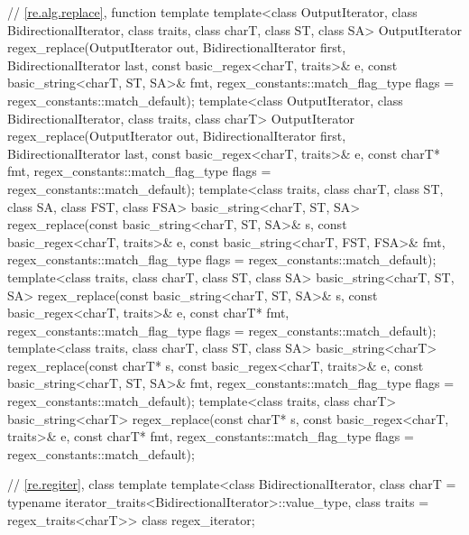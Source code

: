 \begin{codeblock}
{  // \ref{re.alg.replace}, function template 
  template<class OutputIterator, class BidirectionalIterator,
           class traits, class charT, class ST, class SA>
    OutputIterator
      regex_replace(OutputIterator out,
                    BidirectionalIterator first, BidirectionalIterator last,
                    const basic_regex<charT, traits>& e,
                    const basic_string<charT, ST, SA>& fmt,
                    regex_constants::match_flag_type flags = regex_constants::match_default);
  template<class OutputIterator, class BidirectionalIterator, class traits, class charT>
    OutputIterator
      regex_replace(OutputIterator out,
                    BidirectionalIterator first, BidirectionalIterator last,
                    const basic_regex<charT, traits>& e,
                    const charT* fmt,
                    regex_constants::match_flag_type flags = regex_constants::match_default);
  template<class traits, class charT, class ST, class SA, class FST, class FSA>
    basic_string<charT, ST, SA>
      regex_replace(const basic_string<charT, ST, SA>& s,
                    const basic_regex<charT, traits>& e,
                    const basic_string<charT, FST, FSA>& fmt,
                    regex_constants::match_flag_type flags = regex_constants::match_default);
  template<class traits, class charT, class ST, class SA>
    basic_string<charT, ST, SA>
      regex_replace(const basic_string<charT, ST, SA>& s,
                    const basic_regex<charT, traits>& e,
                    const charT* fmt,
                    regex_constants::match_flag_type flags = regex_constants::match_default);
  template<class traits, class charT, class ST, class SA>
    basic_string<charT>
      regex_replace(const charT* s,
                    const basic_regex<charT, traits>& e,
                    const basic_string<charT, ST, SA>& fmt,
                    regex_constants::match_flag_type flags = regex_constants::match_default);
  template<class traits, class charT>
    basic_string<charT>
      regex_replace(const charT* s,
                    const basic_regex<charT, traits>& e,
                    const charT* fmt,
                    regex_constants::match_flag_type flags = regex_constants::match_default);

  // \ref{re.regiter}, class template 
  template<class BidirectionalIterator,
           class charT = typename iterator_traits<BidirectionalIterator>::value_type,
           class traits = regex_traits<charT>>
    class regex_iterator;

}
\end{codeblock}
